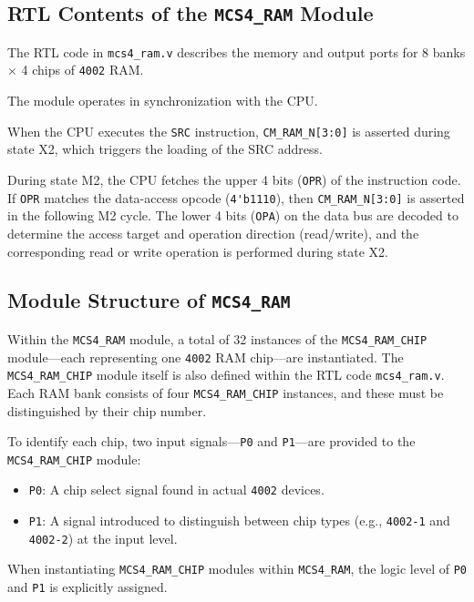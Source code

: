 \subsection{\textbf{RTL Contents of the \texttt{MCS4\_RAM} Module}}
The RTL code in \texttt{mcs4\_ram.v} describes the memory and output ports for 8 banks × 4 chips of \texttt{4002} RAM.  

The module operates in synchronization with the CPU.

When the CPU executes the \texttt{SRC} instruction, \verb|CM_RAM_N[3:0]| is asserted during state X2,  
which triggers the loading of the SRC address.

During state M2, the CPU fetches the upper 4 bits (\texttt{OPR}) of the instruction code.  
If \texttt{OPR} matches the data-access opcode (\verb|4'b1110|), then \verb|CM_RAM_N[3:0]| is asserted in the following M2 cycle.  
The lower 4 bits (\texttt{OPA}) on the data bus are decoded to determine the access target and operation direction (read/write), and the corresponding read or write operation is performed during state X2.

\subsection{Module Structure of \texttt{MCS4\_RAM}}
Within the \texttt{MCS4\_RAM} module, a total of 32 instances of the \texttt{MCS4\_RAM\_CHIP} module—each representing one \texttt{4002} RAM chip—are instantiated.  
The \texttt{MCS4\_RAM\_CHIP} module itself is also defined within the RTL code \texttt{mcs4\_ram.v}.  
Each RAM bank consists of four \texttt{MCS4\_RAM\_CHIP} instances, and these must be distinguished by their chip number.

To identify each chip, two input signals—\texttt{P0} and \texttt{P1}—are provided to the \texttt{MCS4\_RAM\_CHIP} module:
\begin{itemize}
  \item \texttt{P0}: A chip select signal found in actual \texttt{4002} devices.
  \item \texttt{P1}: A signal introduced to distinguish between chip types (e.g., \texttt{4002-1} and \texttt{4002-2}) at the input level.
\end{itemize}

When instantiating \texttt{MCS4\_RAM\_CHIP} modules within \texttt{MCS4\_RAM}, the logic level of \texttt{P0} and \texttt{P1} is explicitly assigned.

